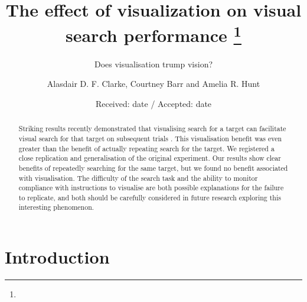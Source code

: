 \documentclass[smallextended]{svjour3}       %
\begin{document}
\title{The effect of visualization on visual search performance
\thanks{}}

\subtitle{Does visualisation trump vision?}


\author{Alasdair D. F. Clarke, Courtney Barr  and  Amelia R. Hunt
}



\date{Received: date / Accepted: date}


\maketitle

\begin{abstract}
Striking results recently demonstrated that visualising search for a target can facilitate visual search for that target on subsequent trials \citep{reinhart2015}. This visualisation benefit was even greater than the benefit of actually repeating search for the target. We registered a close replication and generalisation of the original experiment. Our results show clear benefits of repeatedly searching for the same target, but we found no benefit associated with visualisation. The difficulty of the search task and the ability to monitor compliance with instructions to visualise are both possible explanations for the failure to replicate, and both should be carefully considered in future research exploring this interesting phenomenon.
\end{abstract}

\section{Introduction}
\label{sec:intro}
\end{document}
